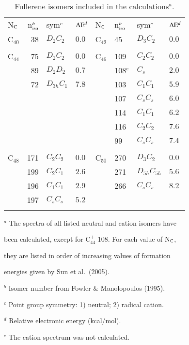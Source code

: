 \documentclass{aa}
\begin{document}
\begin{table}[htbp]
      \caption[]{Fullerene isomers included in the calculations$^a$.}
         \label{tab:lines}
            \begin{tabular}{ l r l l  l l l l}
            \hline
           \noalign{\smallskip}
 {\small N$_{\rm C}$}& n$_{\rm iso}^b$&sym$^c$&{\small $\Delta{\rm E}^d$}&{\small N$_{\rm C}$}& n$_{\rm iso}^b$&sym$^c$&{\small $\Delta{\rm E}^d$} 
\\
      \noalign{\smallskip}
C$_{40}$&38&$D_2 C_2$&$0.0$&C$_{42}$&45&$D_3 C_2$&$0.0$\\
&&&&&&&\\
C$_{44}$&75&$D_2 C_2$&$0.0$&C$_{46}$&109&$C_2 C_2$&$0.0$\\
&89&$D_2 D_2$&$0.7$&&108$^e$&$C_s$&$2.0$\\
&72&$D_{3h} C_1$&$7.8$&&103&$C_1 C_1$&$5.9$\\
&&&&&107&$C_s C_s$&$6.0$\\
&&&&&114&$C_1 C_1$&$6.2$\\
&&&&&116&$C_2 C_2$&$7.6$\\
&&&&&99&$C_s C_s$&$7.4$\\
&&&&&&&\\
C$_{48}$&171&$C_2 C_2$&$0.0$&C$_{50}$&270&$D_3 C_2$&$0.0$\\
&199&$C_2 C_1$&$2.6$&&271&$D_{5h}C_{5h}$&$5.6$\\
&196&$C_1 C_1$&$2.9$&&266&$C_s C_s$&$8.2$\\
&197&$C_s C_s$&$5.2$&&&&\\ 
      \noalign{\smallskip}
            \hline
           \end{tabular}
{\small \begin{list}{}{} 
\item[$^a$ The spectra of all listed neutral and cation isomers have] 
\item[been calculated, except for C$_{44}^+$ 108. For each value of N$_{\rm C}$,] 
\item[they are listed in order of increasing values of formation]
\item[energies given by Sun et al.\ (2005).]
\item[$^b$ Isomer number from Fowler \& Manolopoulos (1995).]
\item[$^c$ Point group symmetry: 1) neutral; 2) radical cation.]  
\item[$^d$ Relative electronic energy (kcal/mol).] 
\item[$^e$ The cation spectrum was not calculated.]
\end{list}}
\end{table} 
\end{document}
